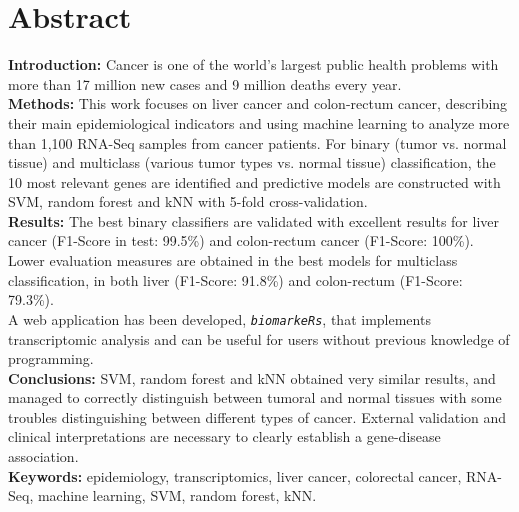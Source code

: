 \newpage
\thispagestyle{plain}

\section*{Abstract}

\textbf{Introduction:} Cancer is one of the world's largest public health problems with more than 17 million new cases and 9 million deaths every year. \\

\textbf{Methods:} This work focuses on liver cancer and colon-rectum cancer, describing their main epidemiological indicators and using machine learning to analyze more than 1,100 RNA-Seq samples from cancer patients. For binary (tumor vs. normal tissue) and multiclass (various tumor types vs. normal tissue) classification, the 10 most relevant genes are identified and predictive models are constructed with SVM, random forest and kNN with 5-fold cross-validation. \\

\textbf{Results:} The best binary classifiers are validated with excellent results for liver cancer (F1-Score in test: 99.5\%) and colon-rectum cancer (F1-Score: 100\%). Lower evaluation measures are obtained in the best models for multiclass classification, in both liver (F1-Score: 91.8\%) and colon-rectum (F1-Score: 79.3\%). \\

A web application has been developed, \texttt{\textit{biomarkeRs}}, that implements transcriptomic analysis and can be useful for users without previous knowledge of programming. \\

\textbf {Conclusions:} SVM, random forest and kNN obtained very similar results, and managed to correctly distinguish between tumoral and normal tissues with some troubles distinguishing between different types of cancer. External validation and clinical interpretations are necessary to clearly establish a gene-disease association.\\


\textbf{Keywords:} epidemiology, transcriptomics, liver cancer, colorectal cancer, RNA-Seq, machine learning, SVM, random forest, kNN.

\newpage
\thispagestyle{empty}

